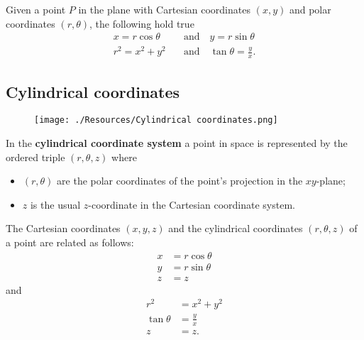 \documentclass[12pt, a4paper]{article}
\begin{document}
\begin{mdthm}
    Given a point \(P\) in the plane with Cartesian coordinates \((x,y)\) and polar coordinates \((r,\theta)\), the following hold true 
    \[\begin{aligned}
        x = r\cos\theta \quad &\text{and} \quad y=r\sin\theta \\
        r^2 =x^2+y^2 \quad &\text{and} \quad \tan\theta = \frac{y}{x}.
    \end{aligned}\]
\end{mdthm}

\subsection{Cylindrical coordinates}

\begin{figure}[H]
     \begin{center}
         \texttt{[image: ./Resources/Cylindrical coordinates.png]}
     \end{center}
\end{figure}

\begin{definition}
    In the \textbf{cylindrical coordinate system} a point in space is represented by the ordered triple \((r,\theta,z)\) where
    \begin{itemize}
        \item \((r,\theta)\) are the polar coordinates of the point's projection in the \(xy\)-plane;
        \item \(z\) is the usual \(z\)-coordinate in the Cartesian coordinate system.
    \end{itemize}
\end{definition}

\begin{mdthm}
    The Cartesian coordinates \((x,y,z)\) and the cylindrical coordinates \((r,\theta,z)\) of a point are related as follows:
    \[\begin{aligned}
        x &= r\cos\theta \\
        y &= r\sin\theta \\
        z&=z 
    \end{aligned}\]
    and
    \[\begin{aligned}
        r^2 &= x^2+y^2 \\
        \tan\theta &= \frac{y}{x} \\
        z &= z.
    \end{aligned}\]
\end{mdthm}
\end{document}
